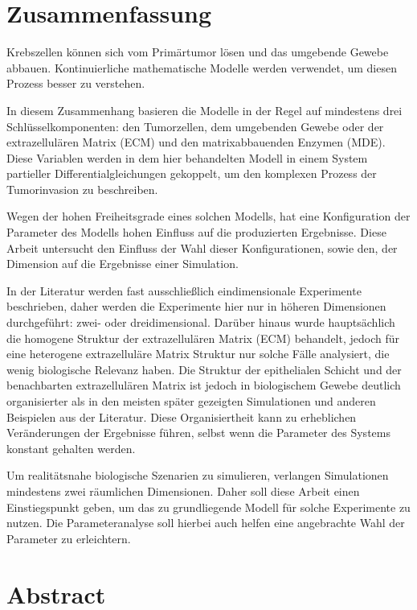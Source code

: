 \section*{Zusammenfassung}

Krebszellen können sich vom Primärtumor lösen und das umgebende Gewebe abbauen. 
Kontinuierliche mathematische Modelle werden verwendet, um diesen Prozess besser zu verstehen.

In diesem Zusammenhang basieren die Modelle in der Regel auf mindestens drei Schlüsselkomponenten: den Tumorzellen, dem umgebenden Gewebe oder der extrazellulären Matrix (ECM) und den matrixabbauenden Enzymen (MDE). Diese Variablen werden in dem hier behandelten Modell in einem System partieller Differentialgleichungen gekoppelt, um den komplexen Prozess der Tumorinvasion zu beschreiben.

Wegen der hohen Freiheitsgrade eines solchen Modells, hat eine Konfiguration der Parameter des Modells hohen Einfluss auf die produzierten Ergebnisse. Diese Arbeit untersucht den Einfluss der Wahl dieser Konfigurationen, sowie den, der Dimension auf die Ergebnisse einer Simulation.

In der Literatur werden fast ausschließlich eindimensionale Experimente beschrieben, daher werden die Experimente hier nur in höheren Dimensionen durchgeführt: zwei- oder dreidimensional. Darüber hinaus wurde hauptsächlich die homogene Struktur der extrazellulären Matrix (ECM) behandelt, jedoch für eine heterogene extrazelluläre Matrix Struktur nur solche Fälle analysiert, die wenig biologische Relevanz haben. Die Struktur der epithelialen Schicht und der benachbarten extrazellulären Matrix ist jedoch in biologischem Gewebe deutlich organisierter als in den meisten später gezeigten Simulationen und anderen Beispielen aus der Literatur. Diese Organisiertheit kann zu erheblichen Veränderungen der Ergebnisse führen, selbst wenn die Parameter des Systems konstant gehalten werden.

Um realitätsnahe biologische Szenarien zu simulieren, verlangen Simulationen mindestens zwei räumlichen Dimensionen. Daher soll diese Arbeit einen Einstiegspunkt geben, um das zu grundliegende Modell für solche Experimente zu nutzen. Die Parameteranalyse soll hierbei auch helfen eine angebrachte Wahl der Parameter zu erleichtern.

\clearpage
\section*{Abstract}

